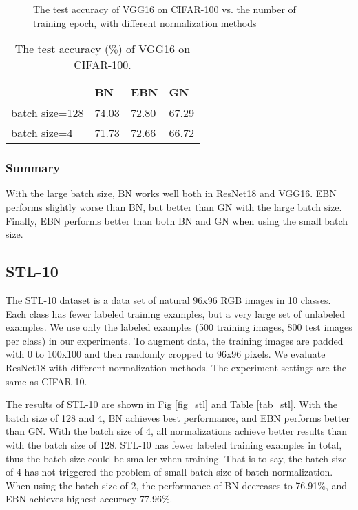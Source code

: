 \documentclass[runningheads]{llncs}
\begin{document}
\begin{figure}[!htb]
\centering
{}
\centering
{}
\caption{The test accuracy of VGG16 on CIFAR-100 vs. the number of training epoch, with different normalization methods}
\label{fig_cifar100_vgg16}
\end{figure}

\begin{table}[!htb]
\caption{The test accuracy (\%) of VGG16 on CIFAR-100.}
\label{tab_cifar100_vgg16}
\centering
\begin{tabular}{l|lll}
\hline
  & BN & EBN & GN \\
\hline
batch size=128     & 74.03  & 	72.80 & 67.29     \\
batch size=4       & 71.73  & 72.66 &   66.72     \\
\hline
\end{tabular}
\end{table}

\subsubsection{Summary}  With the large batch size, BN works well both in ResNet18 and VGG16. EBN performs slightly worse than BN, but better than GN with the large batch size. Finally, EBN performs better than both BN and GN when using the small batch size. 

\subsection{STL-10}

The STL-10 dataset is a data set of natural 96x96 RGB images in 10 classes. Each class has fewer labeled training examples, but a very large set of unlabeled examples. We use only the labeled examples (500 training images, 800 test images per class) in our experiments. 
To augment data, the training images are padded with 0 to 100x100 and then randomly cropped to 96x96 pixels. We evaluate ResNet18 with different normalization methods. The experiment settings are the same as CIFAR-10.


The results of STL-10 are shown in Fig \ref{fig_stl}  and Table \ref{tab_stl}. With the batch size of 128 and 4, BN achieves best performance, and EBN performs better than GN. With the batch size of 4, all normalizations achieve better results than with the batch size of 128. STL-10 has fewer labeled training examples in total, thus the batch size could be smaller when training. That is to say, the batch size of 4 has not triggered the problem of small batch size of batch normalization. When using the batch size of 2, the performance of BN decreases to 76.91\%, and EBN achieves highest accuracy 77.96\%.
\end{document}

